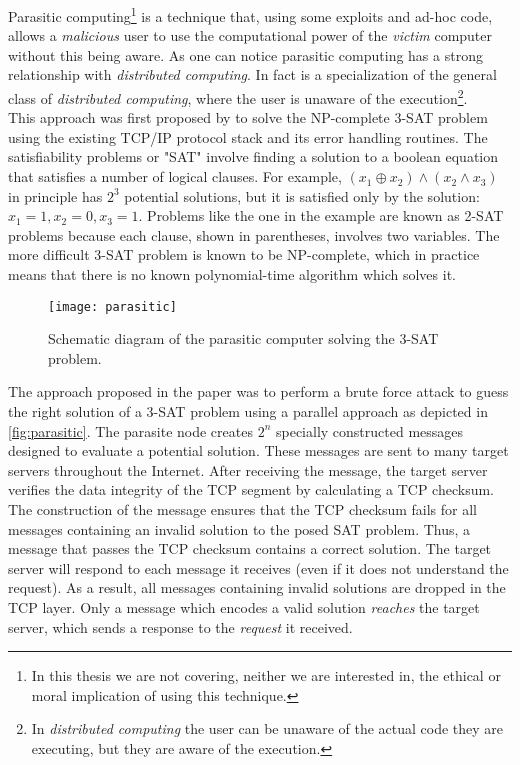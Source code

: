 Parasitic computing\footnote{In this thesis we are not covering, neither
we are interested in, the ethical or moral implication of using this technique.}
is a technique that, using some exploits and ad-hoc code, allows a \emph{malicious}
user to use the computational power of the \emph{victim} computer without this
being aware. As one can notice parasitic computing has a strong relationship
with \emph{distributed computing}. In fact is a specialization of the general
class of \emph{distributed computing}, where the user is unaware of
the execution\footnote{In \emph{distributed computing} the user can be unaware
of the actual code they are executing, but they are aware of the execution.}.\\

This approach was first proposed by \cite{barabasi2001parasitic} to solve the
NP-complete 3-SAT problem using the existing TCP/IP protocol stack and its error
handling routines. The satisfiability problems or "SAT" involve finding a
solution to a boolean equation that satisfies a number of logical clauses. For
example, $(x_1 \oplus x_2) \land (x_2 \land x_3 )$ in principle has $2^3$ potential
solutions, but it is satisfied only by the solution: $x_1=1, x_2=0, x_3=1$.
Problems like the one in the example are known as 2-SAT problems because
each clause, shown in parentheses, involves two variables. The more difficult
3-SAT problem is known to be NP-complete, which in practice means that there is
no known polynomial-time algorithm which solves it.\\
\begin{figure}[htb]
    \centering
    \texttt{[image: parasitic]}
    \caption{Schematic diagram of the parasitic computer solving the 3-SAT
    problem.}
    \label{fig:parasitic}
\end{figure}

The approach proposed in the paper was to perform a brute force attack to guess
the right solution of a 3-SAT problem using a parallel approach as depicted in
\autoref{fig:parasitic}. The parasite node creates $2^n$ specially constructed
messages designed to evaluate a potential solution. These messages are sent to
many target servers throughout the Internet. After receiving the message, the
target server verifies the data integrity of the TCP segment by calculating a
TCP checksum. The construction of the message ensures that the TCP checksum fails
for all messages containing an invalid solution to the posed SAT problem. Thus,
a message that passes the TCP checksum contains a correct solution. The target
server will respond to each message it receives (even if it does not understand
the request). As a result, all messages containing invalid solutions are dropped
in the TCP layer. Only a message which encodes a valid solution \emph{reaches}
the target server, which sends a response to the \emph{request} it received.\\

